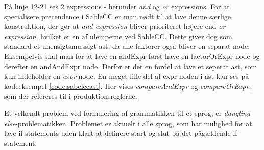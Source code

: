 På linje 12-21 ses 2 expressions - herunder \textit{and} og \textit{or} expressions. For at specialisere precendence i SableCC er man nødt til at lave denne særlige konstruktion, der gør at \textit{and expression} bliver prioriteret højere end \textit{or expression}, hvilket er en af ulemperne ved SableCC. Dette giver dog som standard et uhensigtsmæssigt \gls{ast}, da alle faktorer også bliver en separat node. Eksempelvis skal man for at lave en andExpr først have en factorOrExpr node og derefter en andAndExpr node. Derfor er det en fordel at lave et seperat \gls{ast}, som kun indeholder en \textit{expr}-node. En meget lille del af expr noden i \gls{ast} kan ses på kodeeksempel \ref{code:sabelccast}. Her vises \textit{compareAndExpr} og \textit{compareOrExpr}, som der refereres til i produktionsreglerne.




\label{subsec:danglingelse}
Et velkendt problem ved formulering af grammatikken til et sprog, er \textit{dangling else}-problematikken. Problemet er aktuelt i alle sprog, som har mulighed for at lave if-statements uden klart at definere start og slut på det pågældende if-statement.

